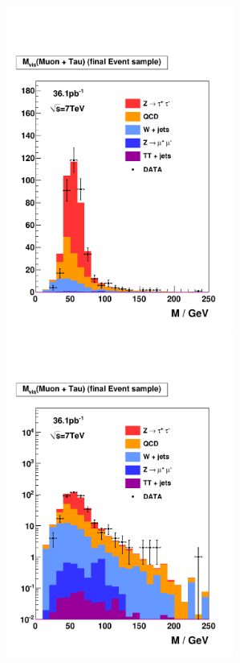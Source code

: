 \begin{figure}[t]
\begin{center}
\includegraphics*[width=75mm]{results_chapter/figures/results_loose/plotAHtoMuTauOS_woBtag_finalSamplePlots_mVisible_linear.pdf}
\includegraphics*[width=75mm]{results_chapter/figures/results_loose/plotAHtoMuTauOS_woBtag_finalSamplePlots_mVisible_log.pdf}

\end{center}
\end{figure}
